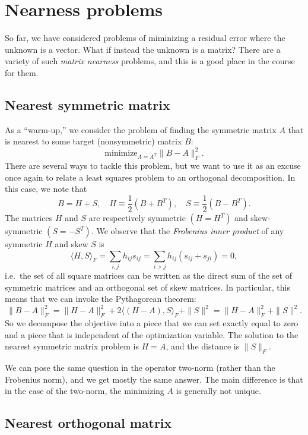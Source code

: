 \section{Nearness problems}

So far, we have considered problems of miminizing a residual error
where the unknown is a vector.  What if instead the unknown is a
matrix?  There are a variety of such {\em matrix nearness} problems,
and this is a good place in the course for them.

\subsection{Nearest symmetric matrix}

As a ``warm-up,'' we consider the problem of finding the
symmetric matrix $A$ that is nearest to some target (nonsymmetric)
matrix $B$:
\[
  \mbox{minimize}_{A=A^T} \|B-A\|_F^2.
\]
There are several ways to tackle this problem, but we want to use
it as an excuse once again to relate a least squares problem to an
orthogonal decomposition.  In this case, we note that
\[
  B = H + S, \quad
  H \equiv \frac{1}{2} (B+B^T), \quad
  S \equiv \frac{1}{2} (B-B^T).
\]
The matrices $H$ and $S$ are respectively symmetric $(H=H^T)$
and skew-symmetric $(S=-S^T)$.  We observe that the
{\em Frobenius inner product} of any symmetric $H$ and skew $S$
is
\[
  \langle H, S \rangle_F =
  \sum_{i,j} h_{ij} s_{ij} =
  \sum_{i > j} h_{ij} (s_{ij} + s_{ji}) = 0,
\]
i.e.~the set of all square matrices can be written as the direct
sum of the set of symmetric matrices and an orthogonal set of
skew matrices.  In particular, this means that we can invoke the
Pythagorean theorem:
\[
  \|B-A\|_F^2 =
  \|H-A\|_F^2 + 2 \langle (H-A), S \rangle_F + \|S\|^2 =
  \|H-A\|_F^2 + \|S\|^2.
\]
So we decompose the objective into a piece that we can set exactly
equal to zero and a piece that is independent of the optimization
variable.  The solution to the nearest symmetric matrix problem is
$H = A$, and the distance is $\|S\|_F$.

We can pose the same question in the operator two-norm (rather than
the Frobenius norm), and we get mostly the same answer.  The main
difference is that in the case of the two-norm, the minimizing $A$
is generally not unique.

\subsection{Nearest orthogonal matrix}

